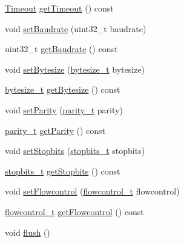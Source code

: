 \begin{DoxyCompactItemize}
\item 
\mbox{\hyperlink{structserial_1_1_timeout}{Timeout}} \mbox{\hyperlink{classserial_1_1_serial_a2502ea6b503c96f64b767365965c4198}{get\+Timeout}} () const
\item 
void \mbox{\hyperlink{classserial_1_1_serial_ad4f7e9edff11b464199e94a43dfd19bf}{set\+Baudrate}} (uint32\+\_\+t baudrate)
\item 
uint32\+\_\+t \mbox{\hyperlink{classserial_1_1_serial_ac7f119828de9efe1cdf559810926755f}{get\+Baudrate}} () const
\item 
void \mbox{\hyperlink{classserial_1_1_serial_adba430fd704f6898a5a1d99fd39a94fa}{set\+Bytesize}} (\mbox{\hyperlink{namespaceserial_a00b3281fa11cea770c0b0c8a106080f8}{bytesize\+\_\+t}} bytesize)
\item 
\mbox{\hyperlink{namespaceserial_a00b3281fa11cea770c0b0c8a106080f8}{bytesize\+\_\+t}} \mbox{\hyperlink{classserial_1_1_serial_ac0d2260901c4d2d99829135341a7d59c}{get\+Bytesize}} () const
\item 
void \mbox{\hyperlink{classserial_1_1_serial_a1e1896aa59ec35ac5bd263b87614ef01}{set\+Parity}} (\mbox{\hyperlink{namespaceserial_a8f45d26bf7c9a06659e75b5004a50481}{parity\+\_\+t}} parity)
\item 
\mbox{\hyperlink{namespaceserial_a8f45d26bf7c9a06659e75b5004a50481}{parity\+\_\+t}} \mbox{\hyperlink{classserial_1_1_serial_aba1b4a81903ab1b0b3ec5a49fd30b6e9}{get\+Parity}} () const
\item 
void \mbox{\hyperlink{classserial_1_1_serial_ab72284b5aab723b81013fb560bd6acc5}{set\+Stopbits}} (\mbox{\hyperlink{namespaceserial_af5b116611d6628a3aa8f788fdc09f469}{stopbits\+\_\+t}} stopbits)
\item 
\mbox{\hyperlink{namespaceserial_af5b116611d6628a3aa8f788fdc09f469}{stopbits\+\_\+t}} \mbox{\hyperlink{classserial_1_1_serial_a2bf619bd500f12fe973244f4c16e430a}{get\+Stopbits}} () const
\item 
void \mbox{\hyperlink{classserial_1_1_serial_ade41650d6bfe91b6432e5a0a60c03969}{set\+Flowcontrol}} (\mbox{\hyperlink{namespaceserial_a93ef57a314b4e562f9eded6c15d34351}{flowcontrol\+\_\+t}} flowcontrol)
\item 
\mbox{\hyperlink{namespaceserial_a93ef57a314b4e562f9eded6c15d34351}{flowcontrol\+\_\+t}} \mbox{\hyperlink{classserial_1_1_serial_a81b78424cc1dda253ee07094eac60733}{get\+Flowcontrol}} () const
\item 
void \mbox{\hyperlink{classserial_1_1_serial_a63b7abf172cad25bfc998b3b1f98310f}{flush}} ()
\item 

\end{DoxyCompactItemize}
